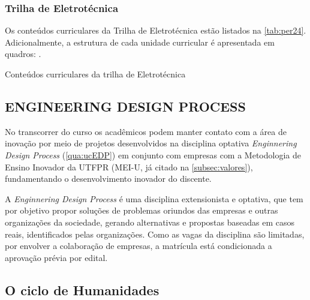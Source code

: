 \clearpage

\subsubsection{Trilha de Eletrotécnica}

Os conteúdos curriculares da Trilha de Eletrotécnica estão listados na \autoref{tab:per24}. Adicionalmente, a estrutura de cada unidade curricular é apresentada em quadros: .

\begin{table}[!htb]
	\centering\footnotesize
	\caption{Conteúdos curriculares da trilha de Eletrotécnica}
	\label{tab:per24}
\end{table}

\clearpage

\subsection{ENGINEERING DESIGN PROCESS}
\label{subsc:edp}

No transcorrer do curso os acadêmicos podem manter contato com a área de inovação por meio de projetos desenvolvidos na disciplina optativa \textit{Enginnering Design Process} (\autoref{qua:ucEDP}) em conjunto com empresas com a Metodologia de Ensino Inovador da UTFPR (MEI-U, já citado na \autoref{subsec:valores}), fundamentando o desenvolvimento inovador do discente.


A \textit{Enginnering Design Process} é uma disciplina extensionista e optativa, que tem por objetivo propor soluções de problemas oriundos das empresas e outras organizações da sociedade, gerando alternativas e propostas baseadas em casos reais, identificados pelas organizações. Como as vagas da disciplina são limitadas, por envolver a colaboração de empresas, a matrícula está condicionada a aprovação prévia por edital.



\subsection{O ciclo de Humanidades}
\label{subsec:humanidades}

